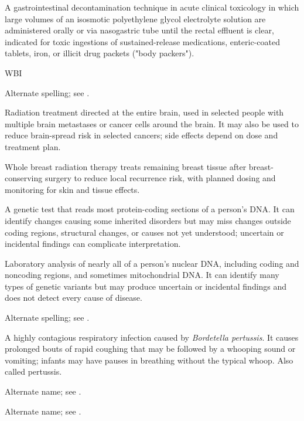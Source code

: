  A gastrointestinal decontamination technique in acute clinical toxicology in which large volumes of an isosmotic polyethylene glycol electrolyte solution are administered orally or via nasogastric tube until the rectal effluent is clear, indicated for toxic ingestions of sustained-release medications, enteric-coated tablets, iron, or illicit drug packets ("body packers").

\synonyms
WBI

 Alternate spelling; see .

 Radiation treatment directed at the entire brain, used in selected people with multiple brain metastases or cancer cells around the brain. It may also be used to reduce brain-spread risk in selected cancers; side effects depend on dose and treatment plan.

 Whole breast radiation therapy treats remaining breast tissue after breast-conserving surgery to reduce local recurrence risk, with planned dosing and monitoring for skin and tissue effects.

 A genetic test that reads most protein-coding sections of a person’s DNA. It can identify changes causing some inherited disorders but may miss changes outside coding regions, structural changes, or causes not yet understood; uncertain or incidental findings can complicate interpretation.

 Laboratory analysis of nearly all of a person's nuclear DNA, including coding and noncoding regions, and sometimes mitochondrial DNA. It can identify many types of genetic variants but may produce uncertain or incidental findings and does not detect every cause of disease.

 Alternate spelling; see .

 A highly contagious respiratory infection caused by \textit{Bordetella pertussis}. It causes prolonged bouts of rapid coughing that may be followed by a whooping sound or vomiting; infants may have pauses in breathing without the typical whoop. Also called pertussis.

 Alternate name; see .

 Alternate name; see .

